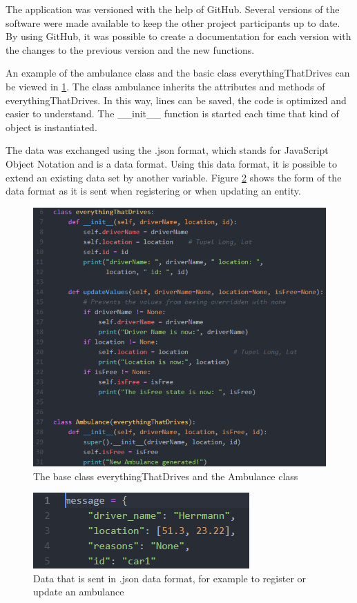 The application was versioned with the help of GitHub. Several versions of the software were made available to keep the other project participants up to date. By using GitHub, it was possible to create a documentation for each version with the changes to the previous version and the new functions.

An example of the ambulance class and the basic class everythingThatDrives can be viewed in \ref{entity}. The class ambulance inherits the attributes and methods of everythingThatDrives. In this way, lines can be saved, the code is optimized and easier to understand. The \_\_init\_\_ function is started each time that kind of object is instantiated.

The data was exchanged using the .json format, which stands for JavaScript Object Notation and is a data format. Using this data format, it is possible to extend an existing data set by another variable. Figure \ref{json} shows the form of the data format as it is sent when registering or when updating an entity.

\begin{figure}
\sidecaption
\includegraphics[scale=0.6]{images/walter/code/entity.png}
\caption{The base class everythingThatDrives and the Ambulance class}
\label{entity}
\end{figure}

\begin{figure}
\sidecaption
\includegraphics[scale=0.6]{images/walter/code/json.png}
\caption{Data that is sent in .json data format, for example to register or update an ambulance}
\label{json}
\end{figure}

